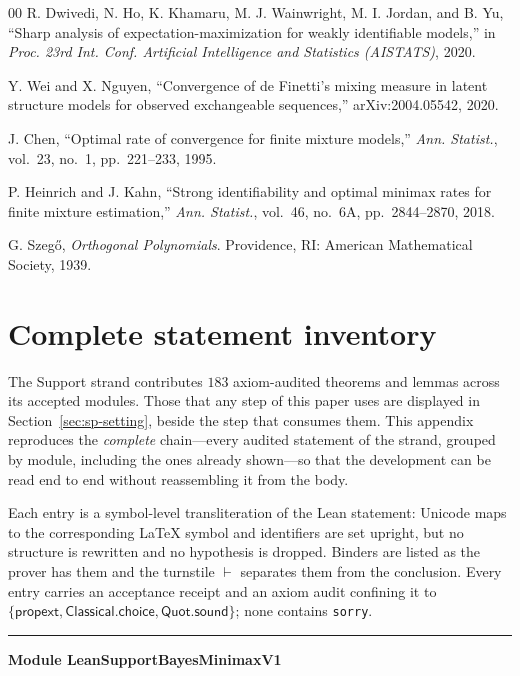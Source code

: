 \documentclass[conference]{IEEEtran}
\theoremstyle{definition}
\newcommand{\lean}[1]{\textsf{\footnotesize #1}}
\begin{document}
\begin{thebibliography}{00}
 R. Dwivedi, N. Ho, K. Khamaru, M. J. Wainwright, M. I. Jordan, and
B. Yu, ``Sharp analysis of expectation-maximization for weakly identifiable models,'' in
\emph{Proc. 23rd Int. Conf. Artificial Intelligence and Statistics (AISTATS)}, 2020.

 Y. Wei and X. Nguyen, ``Convergence of de Finetti's mixing measure in
latent structure models for observed exchangeable sequences,'' arXiv:2004.05542, 2020.

 J. Chen, ``Optimal rate of convergence for finite mixture models,''
\emph{Ann. Statist.}, vol.~23, no.~1, pp.~221--233, 1995.

 P. Heinrich and J. Kahn, ``Strong identifiability and optimal minimax
rates for finite mixture estimation,'' \emph{Ann. Statist.}, vol.~46, no.~6A,
pp.~2844--2870, 2018.

 G. Szeg\H{o}, \emph{Orthogonal Polynomials}. Providence, RI: American
Mathematical Society, 1939.

\end{thebibliography}

\appendices
\section{Complete statement inventory}
\label{app:sp-inventory}

The Support strand contributes $183$ axiom-audited theorems and lemmas across its accepted modules. Those that any step of this paper uses are displayed in Section~\ref{sec:sp-setting}, beside the step that consumes them. This appendix reproduces the \emph{complete} chain---every audited statement of the strand, grouped by module, including the ones already shown---so that the development can be read end to end without reassembling it from the body.

Each entry is a symbol-level transliteration of the Lean statement: Unicode maps to the corresponding \LaTeX{} symbol and identifiers are set upright, but no structure is rewritten and no hypothesis is dropped. Binders are listed as the prover has them and the turnstile $\vdash$ separates them from the conclusion. Every entry carries an acceptance receipt and an axiom audit confining it to $\{\textsf{propext},\textsf{Classical.choice},\textsf{Quot.sound}\}$; none contains \texttt{sorry}.

\vspace{4pt}\noindent\rule{\columnwidth}{0.4pt}\par\vspace{2pt}
\noindent\textbf{Module \lean{LeanSupportBayesMinimaxV1}}\par\vspace{3pt}
\end{document}
